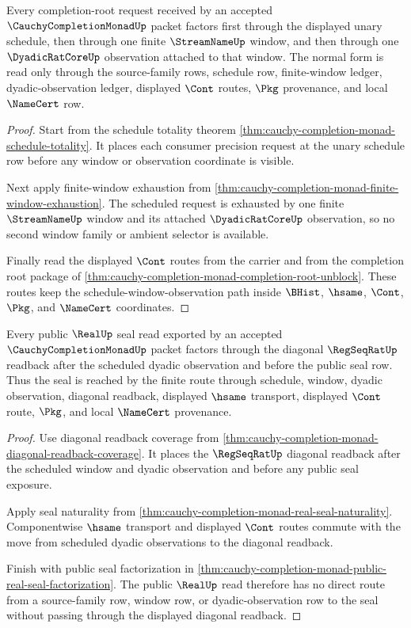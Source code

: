\begin{theorem}
\label{thm:cauchy-completion-monad-root-schedule-window-normal-form}
Every completion-root request received by an accepted $\CauchyCompletionMonadUp$ packet factors first through the displayed unary schedule, then through one finite $\StreamNameUp$ window, and then through one $\DyadicRatCoreUp$ observation attached to that window. The normal form is read only through the source-family rows, schedule row, finite-window ledger, dyadic-observation ledger, displayed $\Cont$ routes, $\Pkg$ provenance, and local $\NameCert$ row.
\end{theorem}
\begin{proof}
Start from the schedule totality theorem \autoref{thm:cauchy-completion-monad-schedule-totality}. It places each consumer precision request at the unary schedule row before any window or observation coordinate is visible.

Next apply finite-window exhaustion from \autoref{thm:cauchy-completion-monad-finite-window-exhaustion}. The scheduled request is exhausted by one finite $\StreamNameUp$ window and its attached $\DyadicRatCoreUp$ observation, so no second window family or ambient selector is available.

Finally read the displayed $\Cont$ routes from the carrier and from the completion root package of \autoref{thm:cauchy-completion-monad-completion-root-unblock}. These routes keep the schedule-window-observation path inside $\BHist$, $\hsame$, $\Cont$, $\Pkg$, and $\NameCert$ coordinates.
\end{proof}

\begin{theorem}
\label{thm:cauchy-completion-monad-root-diagonal-seal-normal-form}
Every public $\RealUp$ seal read exported by an accepted $\CauchyCompletionMonadUp$ packet factors through the diagonal $\RegSeqRatUp$ readback after the scheduled dyadic observation and before the public seal row. Thus the seal is reached by the finite route through schedule, window, dyadic observation, diagonal readback, displayed $\hsame$ transport, displayed $\Cont$ route, $\Pkg$, and local $\NameCert$ provenance.
\end{theorem}
\begin{proof}
Use diagonal readback coverage from \autoref{thm:cauchy-completion-monad-diagonal-readback-coverage}. It places the $\RegSeqRatUp$ diagonal readback after the scheduled window and dyadic observation and before any public seal exposure.

Apply seal naturality from \autoref{thm:cauchy-completion-monad-real-seal-naturality}. Componentwise $\hsame$ transport and displayed $\Cont$ routes commute with the move from scheduled dyadic observations to the diagonal readback.

Finish with public seal factorization in \autoref{thm:cauchy-completion-monad-public-real-seal-factorization}. The public $\RealUp$ read therefore has no direct route from a source-family row, window row, or dyadic-observation row to the seal without passing through the displayed diagonal readback.
\end{proof}

